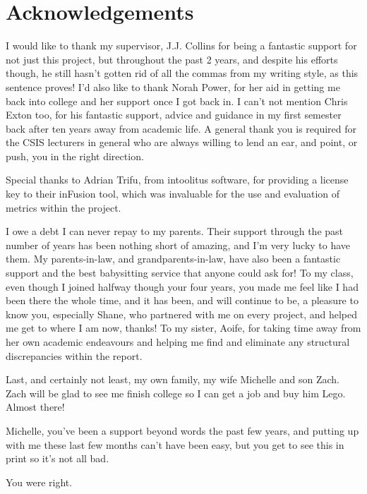\section*{Acknowledgements}    

I would like to thank my supervisor, J.J. Collins for being a fantastic support for not just this project, but throughout the past 2 years, and despite his efforts though, he still hasn't gotten rid of all the commas from my writing style, as this sentence proves! I'd also like to thank Norah Power, for her aid in getting me back into college and her support once I got back in. I can't not mention Chris Exton too, for his fantastic support, advice and guidance in my first semester back after ten years away from academic life. A general thank you is required for the CSIS lecturers in general who are always willing to lend an ear, and point, or push, you in the right direction. 

Special thanks to Adrian Trifu, from intoolitus software, for providing a license key to their inFusion tool, which was invaluable for the use and evaluation of metrics within the project. 

I owe a debt I can never repay to my parents. Their support through the past number of years has been nothing short of amazing, and I'm very lucky to have them. My parents-in-law, and grandparents-in-law, have also been a fantastic support and the best babysitting service that anyone could ask for! To my class, even though I joined halfway though your four years, you made me feel like I had been there the whole time, and it has been, and will continue to be, a pleasure to know you, especially Shane, who partnered with me on every project, and helped me get to where I am now, thanks! To my sister, Aoife, for taking time away from her own academic endeavours and helping me find and eliminate any structural discrepancies within the report.

Last, and certainly not least, my own family, my wife Michelle and son Zach. Zach will be glad to see me finish college so I can get a job and buy him Lego. Almost there!

Michelle, you've been a support beyond words the past few years, and putting up with me these last few months can't have been easy, but you get to see this in print so it's not all bad. 

You were right.